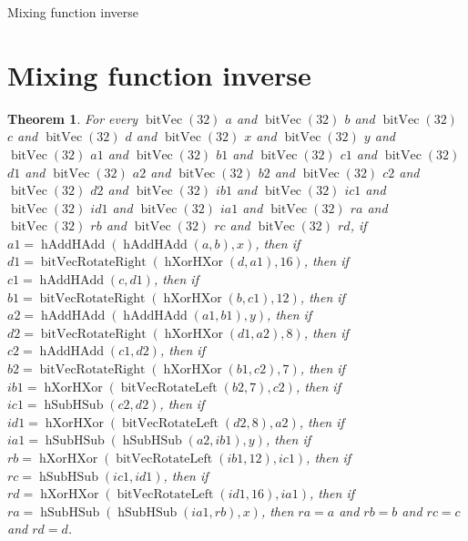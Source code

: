 \documentclass[11pt]{article}
\newtheorem{theorem}{Theorem}[section]
\theoremstyle{definition}
\begin{document}
\begin{center}
{\LARGE Mixing function inverse}
\end{center}
\section{Mixing function inverse}
\label{ll:mixing:inverse}
\begin{theorem}
\label{ll:mixing:mixing-inverse}
For every \(\operatorname{bitVec}(32)\) \(a\) and \(\operatorname{bitVec}(32)\) \(b\) and \(\operatorname{bitVec}(32)\) \(c\) and \(\operatorname{bitVec}(32)\) \(d\) and \(\operatorname{bitVec}(32)\) \(x\) and \(\operatorname{bitVec}(32)\) \(y\) and \(\operatorname{bitVec}(32)\) \(a1\) and \(\operatorname{bitVec}(32)\) \(b1\) and \(\operatorname{bitVec}(32)\) \(c1\) and \(\operatorname{bitVec}(32)\) \(d1\) and \(\operatorname{bitVec}(32)\) \(a2\) and \(\operatorname{bitVec}(32)\) \(b2\) and \(\operatorname{bitVec}(32)\) \(c2\) and \(\operatorname{bitVec}(32)\) \(d2\) and \(\operatorname{bitVec}(32)\) \(ib1\) and \(\operatorname{bitVec}(32)\) \(ic1\) and \(\operatorname{bitVec}(32)\) \(id1\) and \(\operatorname{bitVec}(32)\) \(ia1\) and \(\operatorname{bitVec}(32)\) \(ra\) and \(\operatorname{bitVec}(32)\) \(rb\) and \(\operatorname{bitVec}(32)\) \(rc\) and \(\operatorname{bitVec}(32)\) \(rd\), if \(a1 = \operatorname{hAddHAdd}(\operatorname{hAddHAdd}(a, b), x)\), then if \(d1 = \operatorname{bitVecRotateRight}(\operatorname{hXorHXor}(d, a1), 16)\), then if \(c1 = \operatorname{hAddHAdd}(c, d1)\), then if \(b1 = \operatorname{bitVecRotateRight}(\operatorname{hXorHXor}(b, c1), 12)\), then if \(a2 = \operatorname{hAddHAdd}(\operatorname{hAddHAdd}(a1, b1), y)\), then if \(d2 = \operatorname{bitVecRotateRight}(\operatorname{hXorHXor}(d1, a2), 8)\), then if \(c2 = \operatorname{hAddHAdd}(c1, d2)\), then if \(b2 = \operatorname{bitVecRotateRight}(\operatorname{hXorHXor}(b1, c2), 7)\), then if \(ib1 = \operatorname{hXorHXor}(\operatorname{bitVecRotateLeft}(b2, 7), c2)\), then if \(ic1 = \operatorname{hSubHSub}(c2, d2)\), then if \(id1 = \operatorname{hXorHXor}(\operatorname{bitVecRotateLeft}(d2, 8), a2)\), then if \(ia1 = \operatorname{hSubHSub}(\operatorname{hSubHSub}(a2, ib1), y)\), then if \(rb = \operatorname{hXorHXor}(\operatorname{bitVecRotateLeft}(ib1, 12), ic1)\), then if \(rc = \operatorname{hSubHSub}(ic1, id1)\), then if \(rd = \operatorname{hXorHXor}(\operatorname{bitVecRotateLeft}(id1, 16), ia1)\), then if \(ra = \operatorname{hSubHSub}(\operatorname{hSubHSub}(ia1, rb), x)\), then \(ra = a\) and \(rb = b\) and \(rc = c\) and \(rd = d\).
\end{theorem}
\end{document}
